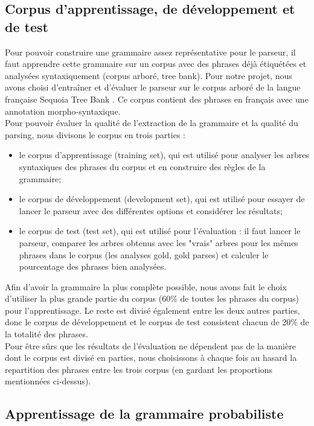 \documentclass[12pt]{article}
\begin{document}
\subsection{Corpus d'apprentissage, de développement et de test}

Pour pouvoir construire une grammaire assez représentative pour le parseur, il
faut apprendre cette grammaire sur un corpus avec des phrases déjà étiquétées et
analysées syntaxiquement (corpus arboré, tree bank). Pour notre projet, nous
avons choisi d'entraîner et d'évaluer le parseur sur le corpus arboré de la
langue française Sequoia Tree Bank \cite{Sequoia}. Ce corpus contient des
phrases en français avec une annotation morpho-syntaxique.\\

Pour pouvoir évaluer la qualité de l'extraction de la grammaire et la qualité du
parsing, nous divisons le corpus en trois parties :
\begin{itemize}
  \item le corpus d'apprentissage (training set), qui est utilisé pour analyser
  les arbres syntaxiques des phrases du corpus et en construire des règles de la
  grammaire;
  \item le corpus de développement (development set), qui est utilisé pour
  essayer de lancer le parseur avec des différentes options et considérer les
  résultats;
  \item le corpus de test (test set), qui est utilisé pour l'évaluation :
  il faut lancer le parseur, comparer les arbres obtenus avec les "vrais" arbres
  pour les mêmes phrases dans le corpus (les analyses gold, gold parses) et
  calculer le pourcentage des phrases bien analysées.
\end{itemize}

Afin d'avoir la grammaire la plus complète possible, nous avons fait le choix
d'utiliser la plus grande partie du corpus (60\% de toutes les phrases du
corpus) pour l'apprentissage. Le reste est divisé également entre les deux
autres parties, donc le corpus de développement et le corpus de test consistent
chacun de 20\% de la totalité des phrases. \\

Pour être sûrs que les résultats de l'évaluation ne dépendent pas de la manière
dont le corpus est divisé en parties, nous choisissons à chaque fois au hasard
la repartition des phrases entre les trois corpus (en gardant les proportions mentionnées
ci-dessus).


\subsection{Apprentissage de la grammaire probabiliste}
\end{document}
